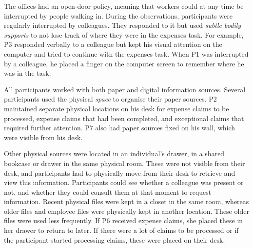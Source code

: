 The offices had an open-door policy, meaning that workers could at any time be interrupted by people walking in. During the observations, participants were regularly interrupted by colleagues. They responded to it but used \textit{subtle bodily supports} to not lose track of where they were in the expenses task. For example, P3 responded verbally to a colleague but kept his visual attention on the computer and tried to continue with the expenses task. When P1 was interrupted by a colleague, he placed a finger on the computer screen to remember where he was in the task.


All participants worked with both paper and digital information sources. Several participants used the physical \textit{space} to organise their paper sources. P2 maintained separate physical locations on his desk for expense claims to be processed, expense claims that had been completed, and exceptional claims that required further attention. P7 also had paper sources fixed on his wall, which were visible from his desk. 

Other physical sources were located in an individual's drawer, in a shared bookcase or drawer in the same physical room. These were not visible from their desk, and participants had to physically move from their desk to retrieve and view this information. Participants could see whether a colleague was present or not, and whether they could consult them at that moment to request information. Recent physical files were kept in a closet in the same room, whereas older files and employee files were physically kept in another location. These older files were used less frequently.
If P6 received expense claims, she placed these in her drawer to return to later. If there were a lot of claims to be processed or if the participant started processing claims, these were placed on their desk. 

